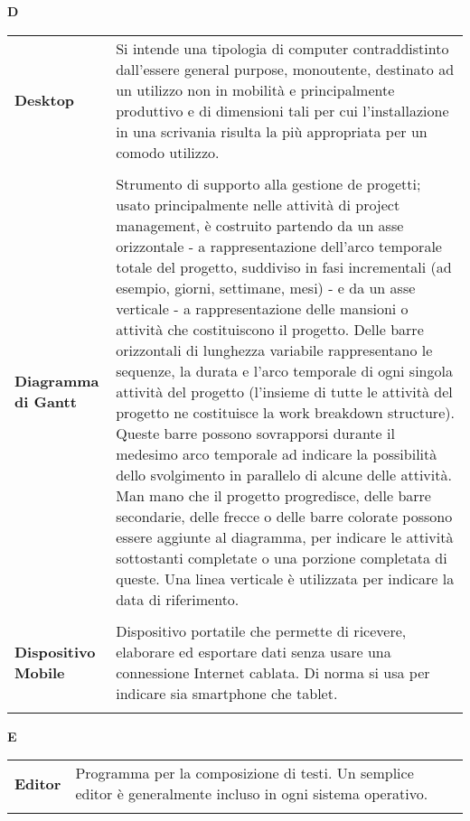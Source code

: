 {\begin{longtable}{L{4cm} p{10cm}}
\end{longtable} 
\newpage 
{} 
{} 
\hfill\Huge{\textbf{D}} \\ 
\normalsize 
\begin{longtable}{L{4cm} p{10cm}}
\textbf{Desktop} & Si intende una tipologia di computer contraddistinto dall’essere general purpose, monoutente, destinato ad un utilizzo non in mobilità e principalmente produttivo e di dimensioni tali per cui l’installazione in una scrivania risulta la più appropriata per un comodo utilizzo. \\ 
 \\ 
\textbf{Diagramma di Gantt} & Strumento di supporto alla gestione de progetti; usato principalmente nelle attività di project management, è costruito partendo da un asse orizzontale - a rappresentazione dell'arco temporale totale del progetto, suddiviso in fasi incrementali (ad esempio, giorni, settimane, mesi) - e da un asse verticale - a rappresentazione delle mansioni o attività che costituiscono il progetto. Delle barre orizzontali di lunghezza variabile rappresentano le sequenze, la durata e l'arco temporale di ogni singola attività del progetto (l'insieme di tutte le attività del progetto ne costituisce la work breakdown structure). Queste barre possono sovrapporsi durante il medesimo arco temporale ad indicare la possibilità dello svolgimento in parallelo di alcune delle attività. Man mano che il progetto progredisce, delle barre secondarie, delle frecce o delle barre colorate possono essere aggiunte al diagramma, per indicare le attività sottostanti completate o una porzione completata di queste. Una linea verticale è utilizzata per indicare la data di riferimento. \\ 
 \\ 
\textbf{Dispositivo Mobile} & Dispositivo portatile che permette di ricevere, elaborare ed esportare dati senza usare una connessione Internet cablata. Di norma si usa per indicare sia smartphone che tablet. \\ 
 \\ 
\end{longtable} 
\newpage 
{} 
{} 
\hfill\Huge{\textbf{E}} \\ 
\normalsize 
\begin{longtable}{L{4cm} p{10cm}}
\textbf{Editor} & Programma per la composizione di testi. Un semplice editor è generalmente incluso in ogni sistema operativo. \\ 
 \\ 

\end{longtable}}
